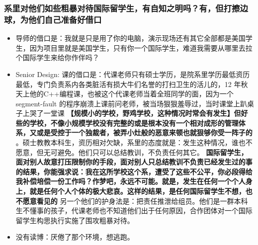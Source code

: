 \documentclass[9pt, b5paper]{article}
\begin{document}
\subsubsection{系里对他们如些粗暴对待国际留学生，有自知之明吗？有，但打擦边球，为他们自己准备好借口}
\label{sec-3-1-3}
\begin{itemize}
\item 导师的借口是：我就是只是用了你的电脑，演示现场还有其它全部都是美国学生，因为项目里就是美国学生，只有你一个国际学生，难道我需要从哪里去拉个国际学生来给你作伴吗？
\item Senior Design: 课的借口是：代课老师只有硕士学历，是院系里学历最低资历最低，专门负责系内各类脏活有损大牛们名誉的打扫卫生的活儿的，12 年秋天上他的C++编程课，也被这个代课老师当着全班同学的面，因为一个 segment-fault 的程序崩溃上课前问老师，被当场狠狠羞辱过，当时课堂上趴桌子上哭了一堂课 \textbf{【规模小的学校，野鸡学校，这种情况时常会有发生】但好些的学校，不像小规模学校没有完整的或是根本没有一个相对成形的管理体系，又或是受控于一个独裁者，被弄小灶般的恶意来顿也就狠够你受一阵子的} 。硕士教教本科生，资历相对欠缺，系里的态度就是：发生这种情况，谁也不愿意，但无可避免。他们只可以总结教训，不负责任何其它。 \textbf{国际留学生，面对别人故意打压限制你的手段，面对别人只总结教训不负责已经发生过的事的结果，你能强求说：我在这所学校这个系，遭受了这些不公平，你必段得给我补偿培偿一份工作吗？作梦吧，永远不可能。就是，发生在任何一个个人身上，就是任何个人个体的极大悲哀。这样的结果，是任何国际留学生不想，也不愿意看见的} 另一个他们的护身法是：把责任推泄给组员。他们是一群本科生不懂事的孩子，代课老师也不知道他们出于任何原因，合作团体对一个国际留学生构思执行实施了围攻粗暴对待。
\item 没有读博：厌倦了那个环境，想逃跑。
\end{itemize}
\end{document}
